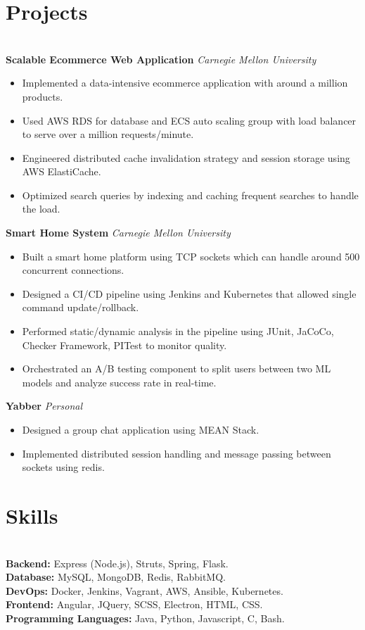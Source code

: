 \documentclass{resume}
\begin{document}
\section*{Projects}
\titlerule
\noindent
\\
\textbf{Scalable Ecommerce Web Application} \hfill \textit{Carnegie Mellon University}
\begin{itemize}
  \item Implemented a data-intensive ecommerce application with around a million products.
  \item Used AWS RDS for database and ECS auto scaling group with load balancer to serve over a million requests/minute.
  \item Engineered distributed cache invalidation strategy and session storage using AWS ElastiCache.
  \item Optimized search queries by indexing and caching frequent searches to handle the load.
\end{itemize}
\textbf{Smart Home System} \hfill \textit{Carnegie Mellon University}
\begin{itemize}
  \item Built a smart home platform using TCP sockets which can handle around 500 concurrent connections.
  \item Designed a CI/CD pipeline using Jenkins and Kubernetes that allowed single command update/rollback.
  \item Performed static/dynamic analysis in the pipeline using JUnit, JaCoCo, Checker Framework, PITest to monitor quality.
  \item Orchestrated an A/B testing component to split users between two ML models and analyze success rate in real-time.
\end{itemize}
\textbf{Yabber} \hfill \textit{Personal}
\begin{itemize}
  \item Designed a group chat application using MEAN Stack.
  \item Implemented distributed session handling and message passing between sockets using redis.
\end{itemize}
\section*{Skills}
\titlerule
\noindent
\\
\textbf{Backend:} Express (Node.js), Struts, Spring, Flask. \\
\textbf{Database:} MySQL, MongoDB, Redis, RabbitMQ. \\
\textbf{DevOps:} Docker, Jenkins, Vagrant, AWS, Ansible, Kubernetes. \\
\textbf{Frontend:} Angular, JQuery, SCSS, Electron, HTML, CSS. \\
\textbf{Programming Languages:} Java, Python, Javascript, C, Bash.
\end{document}
